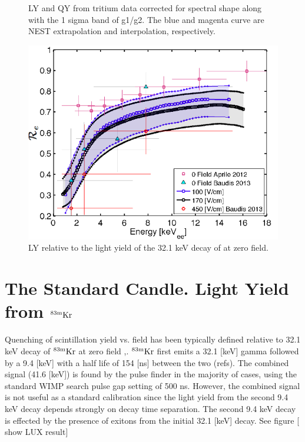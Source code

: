 \begin{figure}[h!]
\caption{LY and QY from tritium data corrected for spectral shape along with the 1 sigma band of g1/g2. The blue and magenta curve are NEST extrapolation and interpolation, respectively.}
\label{fig:LYQY_iter1}
\end{figure}
\renewcommand{\baselinestretch}{2}
\small\normalsize




 \begin{figure}[h!]\centering
 \includegraphics[width=140mm]{Chapter_Flucs/Figures/LYQY_iter1/Re_fig.png}
\caption{LY relative to the light yield of the 32.1 keV decay of \KrCal at zero field.}
\label{fig:LYQY_data}
\end{figure}

\newpage

\section{The Standard Candle. Light Yield from $\rm^{83m}Kr$}

Quenching of scintillation yield vs. field has been  typically defined relative to 32.1 keV decay of $\rm^{83m}Kr$ at zero field \cite{Aprile_LY},\cite{Baudis}. $\rm^{83m}Kr$ first emits a 32.1 [keV] gamma followed by a 9.4 [keV] with a half life of 154 [ns] between the two (refs). The combined signal (41.6 [keV]) is found by the pulse finder in the majority of cases, using the standard WIMP search pulse gap setting of 500 ns. However, the combined signal is not useful as a standard calibration since the light yield from the second 9.4 keV decay depends strongly on decay time separation. The second 9.4 keV decay is effected by the presence of exitons from the initial 32.1 [keV] decay. See figure [ show LUX result]

